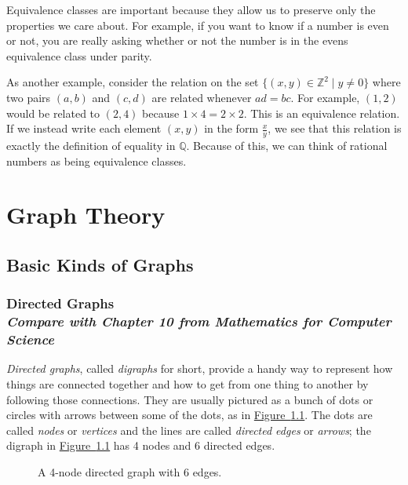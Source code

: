 \documentclass[11pt,oneside]{book}
\theoremstyle{definition}
\begin{document}
Equivalence classes are important because they allow us to preserve only the properties we care about.
For example, if you want to know if a number is even or not, you are really asking whether or not the number is in the evens equivalence class under parity.

As another example, consider the relation on the set $\{ (x, y) \in \mathbb{Z}^{2} \mid y \neq 0 \}$ where two pairs $(a, b)$ and $(c, d)$ are related whenever $ad = bc$.
For example, $(1, 2)$ would be related to $(2, 4)$ because $1 \times 4 = 2 \times 2$.
This is an equivalence relation.
If we instead write each element $(x, y)$ in the form $\frac{x}{y}$, we see that this relation is exactly the definition of equality in $\mathbb{Q}$.
Because of this, we can think of rational numbers as being equivalence classes.



\chapter{Graph Theory}
\section{Basic Kinds of Graphs}
\subsection[Directed Graphs]{Directed Graphs\\[0.5ex]
\normalsize\normalfont\textit{
    Compare with Chapter 10 from \emph{Mathematics for Computer Science}
}} %
\emph{Directed graphs}, called \emph{digraphs} for short, provide a handy way to represent how things are connected together and how to get from one thing to another by following those connections.
They are usually pictured as a bunch of dots or circles with arrows between some of the dots, as in \hyperref[fig:digraph6Edges]{Figure~\ref*{fig:digraph6Edges}}.
The dots are called \emph{nodes} or \emph{vertices} and the lines are called \emph{directed edges} or \emph{arrows}; the digraph in \hyperref[fig:digraph6Edges]{Figure~\ref*{fig:digraph6Edges}} has 4 nodes and 6 directed edges.

\begin{figure}[H]
  \centering
  \caption{A 4-node directed graph with 6 edges.}
  \label{fig:digraph6Edges}
\end{figure}
\end{document}
